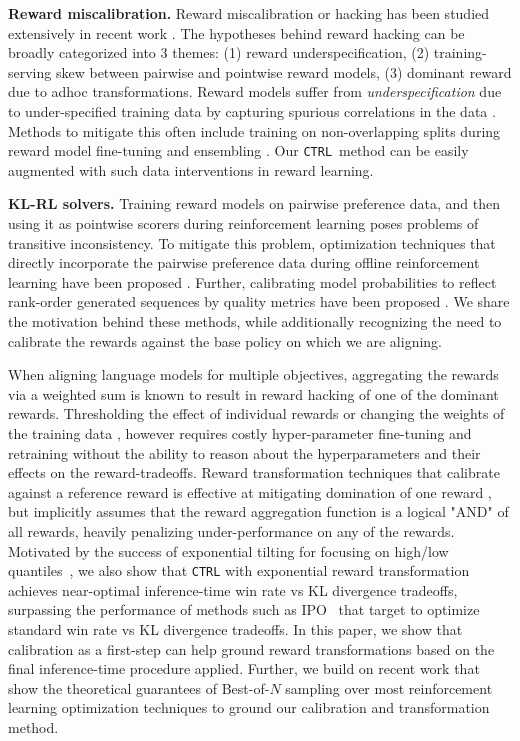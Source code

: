\documentclass{article}
\newcommand{\ctrl}{\texttt{CTRL}\xspace}
\begin{document}
\textbf{Reward miscalibration.}
Reward miscalibration or hacking has been studied extensively in recent work \citep{amodei2016concrete, pang2022reward, gao2023scaling}. The hypotheses behind reward hacking can be broadly categorized into 3 themes: (1) reward underspecification, (2) training-serving skew between pairwise and pointwise reward models, (3) dominant reward due to adhoc transformations.
%
%
%
%
Reward models suffer from \textit{underspecification} due to under-specified training data \citep{skalse2022defining} by capturing spurious correlations in the data \citep{pan2022effects}. Methods to mitigate this often include training on non-overlapping splits during reward model fine-tuning \citep{bai2022training} and ensembling \citep{coste2023reward, eisenstein2023helping}. Our \ctrl\ method can be easily augmented with such data interventions in reward learning.

\textbf{KL-RL solvers.}
Training reward models on pairwise preference data, and then using it as pointwise scorers during reinforcement learning poses problems of transitive inconsistency. To mitigate this problem, optimization techniques that directly incorporate the pairwise preference data during offline reinforcement learning have been proposed \citep{rafailov2024direct, azar2023general}. Further, calibrating model probabilities to reflect rank-order generated sequences by quality metrics have been proposed \citep{zhao2022calibrating}. We share the motivation behind these methods, while additionally recognizing the need to calibrate the rewards against the base policy on which we are aligning.

When aligning language models for multiple objectives, aggregating the rewards via a weighted sum \citep{bai2022training, wu2024fine} is known to result in reward hacking of one of the dominant rewards. Thresholding the effect of individual rewards \citep{moskovitz2023confronting} or changing the weights of the training data \citep{bai2022training}, however requires costly hyper-parameter fine-tuning and retraining without the ability to reason about the hyperparameters and their effects on the reward-tradeoffs. Reward transformation techniques that calibrate against a reference reward is effective at mitigating domination of one reward \citep{wang2024transforming}, but implicitly assumes that the reward aggregation function is a logical "AND" of all rewards, heavily penalizing under-performance on any of the rewards. Motivated by the success of exponential tilting for focusing on high/low quantiles~\citep{li2023tilted}, we also show that \ctrl with exponential reward transformation achieves near-optimal inference-time win rate vs KL divergence tradeoffs, surpassing the performance of methods such as IPO~\citep{azar2023general} that target to optimize standard win rate vs KL divergence tradeoffs. In this paper, we show that calibration as a first-step can help ground reward transformations based on the final inference-time procedure applied. Further, we build on recent work that show the theoretical guarantees of Best-of-$N$ sampling \citep{beirami2024theoretical,gao2023scaling,mudgal2023controlled} over most reinforcement learning optimization techniques to ground our calibration and transformation method.
\end{document}
